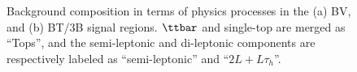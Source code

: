 \clearpage
\begin{figure}[h]
  \centering
    \caption{ Background composition in terms of physics processes in the (a) BV, and (b) BT/3B signal regions. $\ttbar$ and single-top are merged as ``Tops'', and the semi-leptonic and di-leptonic components are respectively labeled as ``semi-leptonic'' and ``$2L+L\tau_h$''. \label{fig::BGestimation::BGcomposition_splitLv2} }
\end{figure}

